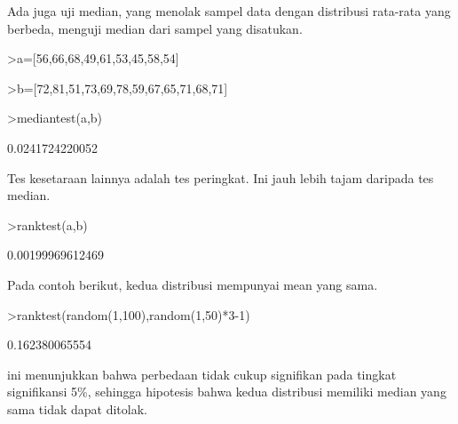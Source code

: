 \documentclass{article}
\begin{document}
\begin{eulernotebook}
\begin{eulercomment}
\begin{eulercomment}
\begin{eulercomment}
\begin{eulercomment}
\begin{eulercomment}
Ada juga uji median, yang menolak sampel data dengan distribusi
rata-rata yang berbeda, menguji median dari sampel yang disatukan.
\end{eulercomment}
\begin{eulerprompt}
>a=[56,66,68,49,61,53,45,58,54]
\end{eulerprompt}
\begin{euleroutput}
  [56,  66,  68,  49,  61,  53,  45,  58,  54]
\end{euleroutput}
\begin{eulerprompt}
>b=[72,81,51,73,69,78,59,67,65,71,68,71]
\end{eulerprompt}
\begin{euleroutput}
  [72,  81,  51,  73,  69,  78,  59,  67,  65,  71,  68,  71]
\end{euleroutput}
\begin{eulerprompt}
>mediantest(a,b)
\end{eulerprompt}
\begin{euleroutput}
  0.0241724220052
\end{euleroutput}
\begin{eulercomment}
Tes kesetaraan lainnya adalah tes peringkat. Ini jauh lebih tajam
daripada tes median.
\end{eulercomment}
\begin{eulerprompt}
>ranktest(a,b)
\end{eulerprompt}
\begin{euleroutput}
  0.00199969612469
\end{euleroutput}
\begin{eulercomment}
Pada contoh berikut, kedua distribusi mempunyai mean yang sama.
\end{eulercomment}
\begin{eulerprompt}
>ranktest(random(1,100),random(1,50)*3-1)
\end{eulerprompt}
\begin{euleroutput}
  0.162380065554
\end{euleroutput}
\begin{eulercomment}
ini menunjukkan bahwa perbedaan tidak cukup signifikan pada tingkat
signifikansi 5\%, sehingga hipotesis bahwa kedua distribusi memiliki
median yang sama tidak dapat ditolak.


\end{eulercomment}
\end{eulercomment}
\end{eulercomment}
\end{eulercomment}
\end{eulercomment}
\end{eulernotebook}
\end{document}
